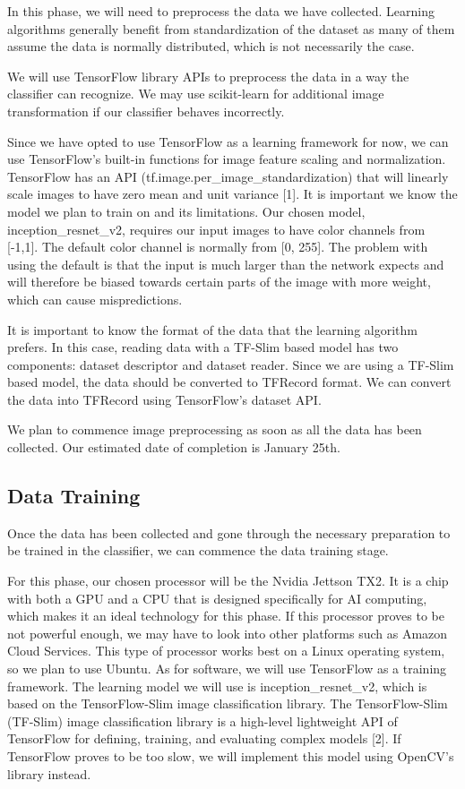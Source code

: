 \documentclass[onecolumn, draftclsnofoot,10pt, compsoc]{IEEEtran}
\begin{document}
In this phase, we will need to preprocess the data we have collected. Learning algorithms generally benefit from standardization of the dataset as many of them assume the data is normally distributed, which is not necessarily the case.


We will use TensorFlow library APIs to preprocess the data in a way the classifier can recognize. We may use scikit-learn for additional image transformation if our classifier behaves incorrectly.


Since we have opted to use TensorFlow as a learning framework for now, we can use TensorFlow's built-in functions for image feature scaling and normalization. TensorFlow has an API (tf.image.per\_image\_standardization) that will linearly scale images to have zero mean and unit variance [1]. It is important we know the model we plan to train on and its limitations. Our chosen model, inception\_resnet\_v2, requires our input images to have color channels from [-1,1]. The default color channel is normally from [0, 255]. The problem with using the default is that the input is much larger than the network expects and will therefore be biased towards certain parts of the image with more weight, which can cause mispredictions. 

It is important to know the format of the data that the learning algorithm prefers. In this case, reading data with a TF-Slim based model has two components: dataset descriptor and dataset reader. Since we are using a TF-Slim based model, the data should be converted to TFRecord format. We can convert the data into TFRecord using TensorFlow's dataset API. 

We plan to commence image preprocessing as soon as all the data has been collected. Our estimated date of completion is January 25th. 

\subsection{Data Training}

Once the data has been collected and gone through the necessary preparation to be trained in the classifier, we can commence the data training stage. 


For this phase, our chosen processor will be the Nvidia Jettson TX2. It is a chip with both a GPU and a CPU that is designed specifically for AI computing, which makes it an ideal technology for this phase. If this processor proves to be not powerful enough, we may have to look into other platforms such as Amazon Cloud Services. This type of processor works best on a Linux operating system, so we plan to use Ubuntu. As for software, we will use TensorFlow as a training framework. The learning model we will use is inception\_resnet\_v2, which is based on the TensorFlow-Slim image classification library. The TensorFlow-Slim  (TF-Slim) image classification library is a high-level lightweight API of TensorFlow for defining, training, and evaluating complex models [2]. If TensorFlow proves to be too slow, we will implement this model using OpenCV's library instead. 
\end{document}
